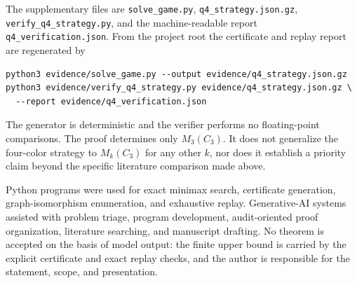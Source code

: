 \documentclass[11pt]{article}
\begin{document}
The supplementary files are \texttt{solve\_game.py},
\texttt{q4\_strategy.json.gz}, \texttt{verify\_q4\_strategy.py}, and the
machine-readable report \texttt{q4\_verification.json}.  From the project
root the certificate and replay report are regenerated by
\begin{verbatim}
python3 evidence/solve_game.py --output evidence/q4_strategy.json.gz
python3 evidence/verify_q4_strategy.py evidence/q4_strategy.json.gz \
  --report evidence/q4_verification.json
\end{verbatim}
The generator is deterministic and the verifier performs no floating-point
comparisons.  The proof determines only $M_3(C_3)$.  It does not generalize
the four-color strategy to $M_k(C_3)$ for any other $k$, nor does it establish
a priority claim beyond the specific literature comparison made above.

Python programs were used for exact minimax search, certificate generation,
graph-isomorphism enumeration, and exhaustive replay.  Generative-AI systems
assisted with problem triage, program development, audit-oriented proof
organization, literature searching, and manuscript drafting.  No theorem is
accepted on the basis of model output: the finite upper bound is carried by
the explicit certificate and exact replay checks, and the author is
responsible for the statement, scope, and presentation.



\end{document}
